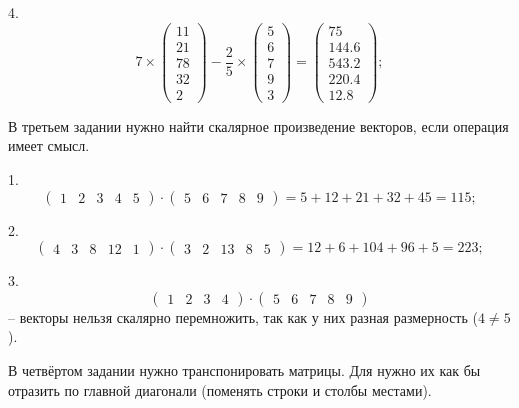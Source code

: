 \documentclass[14pt,a4paper]{extarticle}
\begin{document}
4. \[7\times\begin{pmatrix} 11 \\ 21 \\ 78 \\ 32 \\ 2 \end{pmatrix}-\frac{2}{5}\times\begin{pmatrix} 5 \\ 6 \\ 7 \\ 9 \\ 3 \end{pmatrix}
=\begin{pmatrix} 75 \\ 
    144.6 \\ 
    543.2 \\ 
    220.4 \\ 
    12.8 \end{pmatrix};\]

В третьем задании нужно найти скалярное произведение векторов, если операция имеет смысл.

1. \[\begin{pmatrix} 1 & 2 & 3 & 4 & 5 \end{pmatrix}\cdot\begin{pmatrix} 5 & 6 & 7 & 8 & 9 \end{pmatrix} = 5 + 12 + 21 + 32 + 45 = 115;\]

2. \[\begin{pmatrix} 4 & 3 & 8 & 12 & 1 \end{pmatrix}\cdot\begin{pmatrix} 3 & 2 & 13 & 8 & 5 \end{pmatrix} = 12 + 6 + 104 + 96 + 5 = 223;\]

3. \[\begin{pmatrix} 1 & 2 & 3 & 4 \end{pmatrix}\cdot\begin{pmatrix} 5 & 6 & 7 & 8 & 9 \end{pmatrix}\]
-- векторы нельзя скалярно перемножить, так как у них разная размерность ($4 \neq 5$).

В четвёртом задании нужно транспонировать матрицы. Для нужно их как бы отразить по главной диагонали (поменять строки и столбы местами).
\end{document}
